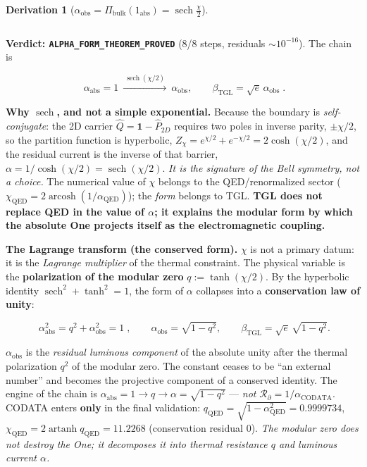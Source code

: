 \documentclass[11pt]{article}
\newcommand{\bTGL}{\beta_{\mathrm{TGL}}}\newcommand{\Msun}{M_{\odot}}\newcommand{\TGL}{\mathrm{TGL}}
\theoremstyle{definition}\newtheorem{deriv}{Derivation}
\begin{document}
\begin{deriv}[$\alpha_{\mathrm{obs}}=\Pi_{\mathrm{bulk}}(1_{\mathrm{abs}})=\operatorname{sech}\tfrac\chi2$]
\begin{center}
\begin{tabular}{p{} l}
\hline\end{tabular}\end{center}

\textbf{Verdict: \texttt{ALPHA\_FORM\_THEOREM\_PROVED}} (8/8 steps, residuals $\sim10^{-16}$). The chain is

\begin{equation}\boxed{\;\alpha_{\mathrm{abs}}=1\ \xrightarrow{\ \operatorname{sech}(\chi/2)\ }\ \alpha_{\mathrm{obs}},\qquad \bTGL=\sqrt e\,\alpha_{\mathrm{obs}}\;}.\end{equation}

\textbf{Why $\operatorname{sech}$, and not a simple exponential.} Because the boundary is \emph{self-conjugate}: the 2D carrier $\hat Q=\mathbf 1-\hat P_{2D}$ requires two poles in inverse parity, $\pm\chi/2$, so the partition function is hyperbolic, $Z_\chi=e^{\chi/2}+e^{-\chi/2}=2\cosh(\chi/2)$, and the residual current is the inverse of that barrier, $\alpha=1/\cosh(\chi/2)=\operatorname{sech}(\chi/2)$. \emph{It is the signature of the Bell symmetry, not a choice.} The numerical value of $\chi$ belongs to the QED/renormalized sector ($\chi_{\mathrm{QED}}=2\operatorname{arcosh}(1/\alpha_{\mathrm{QED}})$); the \emph{form} belongs to TGL. \textbf{TGL does not replace QED in the value of $\alpha$; it explains the modular form by which the absolute One projects itself as the electromagnetic coupling.}

\textbf{The Lagrange transform (the conserved form).} $\chi$ is not a primary datum: it is the \emph{Lagrange multiplier} of the thermal constraint. The physical variable is the \textbf{polarization of the modular zero} $q:=\tanh(\chi/2)$. By the hyperbolic identity $\operatorname{sech}^2+\tanh^2=1$, the form of $\alpha$ collapses into a \textbf{conservation law of unity}:

\begin{equation}\boxed{\;\alpha_{\mathrm{abs}}^2=q^2+\alpha_{\mathrm{obs}}^2=1\;},\qquad \alpha_{\mathrm{obs}}=\sqrt{1-q^2},\qquad \bTGL=\sqrt e\,\sqrt{1-q^2}.\end{equation}

$\alpha_{\mathrm{obs}}$ is the \emph{residual luminous component} of the absolute unity after the thermal polarization $q^2$ of the modular zero. The constant ceases to be ``an external number'' and becomes the projective component of a conserved identity. The engine of the chain is $\alpha_{\mathrm{abs}}=1\to q\to\alpha=\sqrt{1-q^2}$ --- \emph{not} $\mathcal R_\partial=1/\alpha_{\mathrm{CODATA}}$. CODATA enters \textbf{only} in the final validation: $q_{\mathrm{QED}}=\sqrt{1-\alpha_{\mathrm{QED}}^2}=0.9999734$, $\chi_{\mathrm{QED}}=2\operatorname{artanh}q_{\mathrm{QED}}=11.2268$ (conservation residual $0$). \emph{The modular zero does not destroy the One; it decomposes it into thermal resistance $q$ and luminous current $\alpha$.}\end{deriv}
\end{document}

